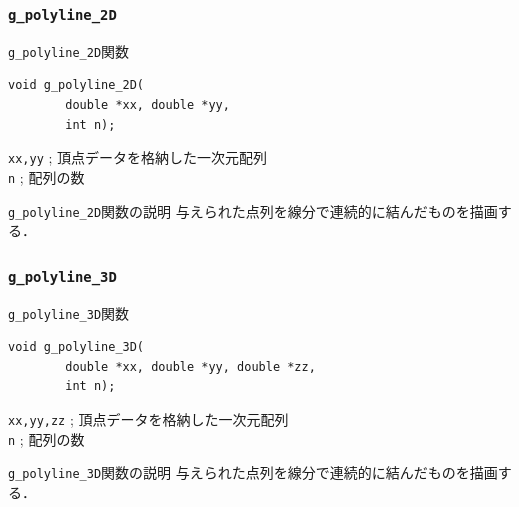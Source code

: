 \documentclass[platex,a4paper,12pt]{jsarticle}%
\begin{document}
\clearpage
\subsubsection{\texttt{g\_polyline\_2D}}

\begin{itembox}[l]{\texttt{g\_polyline\_2D}関数}
\begin{verbatim}
void g_polyline_2D(
        double *xx, double *yy,
        int n);
\end{verbatim}
\verb|xx,yy| ; 頂点データを格納した一次元配列\\
\verb|n| ; 配列の数
\end{itembox}

\begin{itembox}[l]{\texttt{g\_polyline\_2D}関数の説明}
与えられた点列を線分で連続的に結んだものを描画する．
\end{itembox}




\clearpage
\subsubsection{\texttt{g\_polyline\_3D}}

\begin{itembox}[l]{\texttt{g\_polyline\_3D}関数}
\begin{verbatim}
void g_polyline_3D(
        double *xx, double *yy, double *zz,
        int n);
\end{verbatim}
\verb|xx,yy,zz| ; 頂点データを格納した一次元配列\\
\verb|n| ; 配列の数
\end{itembox}

\begin{itembox}[l]{\texttt{g\_polyline\_3D}関数の説明}
与えられた点列を線分で連続的に結んだものを描画する．
\end{itembox}
\end{document}

